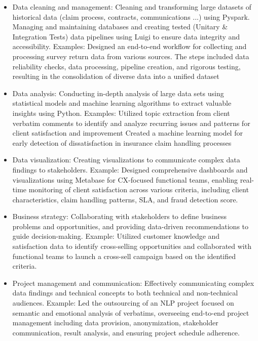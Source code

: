 \documentclass[10pt,letter,ragged2e,withhyper]{altacv}
\begin{document}
\begin{paracol}{2}



\begin{itemize}
  \item Data cleaning and management: Cleaning and transforming large datasets of historical data (claim process, contracts, communications ...) using Pyspark. Managing and maintaining databases and creating tested (Unitary \& Integration Tests) data pipelines using Luigi to ensure data integrity and accessibility. Examples: Designed an end-to-end workflow for collecting and processing survey return data from various sources. The steps included data reliability checks, data processing, pipeline creation, and rigorous testing, resulting in the consolidation of diverse data into a unified dataset
  \item Data analysis: Conducting in-depth analysis of large data sets using statistical models and machine learning algorithms to extract valuable insights using Python. Examples: Utilized topic extraction from client verbatim comments to identify and analyze recurring issues and patterns for client satisfaction and improvement Created a machine learning model for early detection of dissatisfaction in insurance claim handling processes 
  \item Data visualization: Creating visualizations to communicate complex data findings to stakeholders. Example: Designed comprehensive dashboards and visualizations using Metabase for CX-focused functional teams, enabling real-time monitoring of client satisfaction across various criteria, including client characteristics, claim handling patterns, SLA, and fraud detection score. 
  \item Business strategy: Collaborating with stakeholders to define business problems and opportunities, and providing data-driven recommendations to guide decision-making. Example: Utilized customer knowledge and satisfaction data to identify cross-selling opportunities and collaborated with functional teams to launch a cross-sell campaign based on the identified criteria. 
  \item Project management and communication: Effectively communicating complex data findings and technical concepts to both technical and non-technical audiences. Example: Led the outsourcing of an NLP project focused on semantic and emotional analysis of verbatims, overseeing end-to-end project management including data provision, anonymization, stakeholder communication, result analysis, and ensuring project schedule adherence.
\end{itemize}


\end{paracol}
\end{document}
